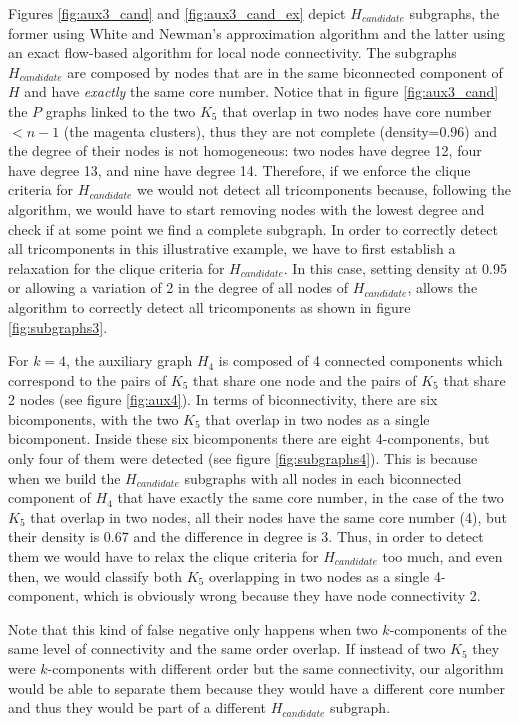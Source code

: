 Figures \ref{fig:aux3_cand} and \ref{fig:aux3_cand_ex} depict $H_{candidate}$ subgraphs, the former using White and Newman's approximation algorithm and the latter using an exact flow-based algorithm for local node connectivity. The subgraphs $H_{candidate}$ are composed by nodes that are in the same biconnected component of $H$ and have \emph{exactly} the same core number. Notice that in figure \ref{fig:aux3_cand} the $P$ graphs linked to the two $K_5$ that overlap in two nodes have core number $< n-1$ (the magenta clusters), thus they are not complete (density=0.96) and the degree of their nodes is not homogeneous: two nodes have degree 12, four have degree 13, and nine have degree 14. Therefore, if we enforce the clique criteria for $H_{candidate}$ we would not detect all tricomponents because, following the algorithm, we would have to start removing nodes with the lowest degree and check if at some point we find a complete subgraph. In order to correctly detect all tricomponents in this illustrative example, we have to first establish a relaxation for the clique criteria for $H_{candidate}$. In this case, setting density at 0.95 or allowing a variation of 2 in the degree of all nodes of $H_{candidate}$, allows the algorithm to correctly detect all tricomponents as shown in figure \ref{fig:subgraphs3}.

For $k=4$, the auxiliary graph $H_4$ is composed of 4 connected components which correspond to the pairs of $K_5$ that share one node and the pairs of $K_5$ that share 2 nodes (see figure \ref{fig:aux4}). In terms of biconnectivity, there are six bicomponents, with the two $K_5$ that overlap in two nodes as a single bicomponent. Inside these six bicomponents there are eight 4-components, but only four of them were detected (see figure \ref{fig:subgraphs4}). This is because when we build the $H_{candidate}$ subgraphs with all nodes in each biconnected component of $H_4$ that have exactly the same core number, in the case of the two $K_5$ that overlap in two nodes, all their nodes  have the same core number (4), but their density is 0.67 and the difference in degree is 3. Thus, in order to detect them we would have to relax the clique criteria for $H_{candidate}$ too much, and even then, we would classify both $K_5$ overlapping in two nodes as a single 4-component, which is obviously wrong because they have node connectivity 2.

Note that this kind of false negative only happens when two $k$-components of the same level of connectivity and the same order overlap. If instead of two $K_5$ they were $k$-components with different order but the same connectivity, our algorithm would be able to separate them because they would have a different core number and thus they would be part of a different $H_{candidate}$ subgraph.

